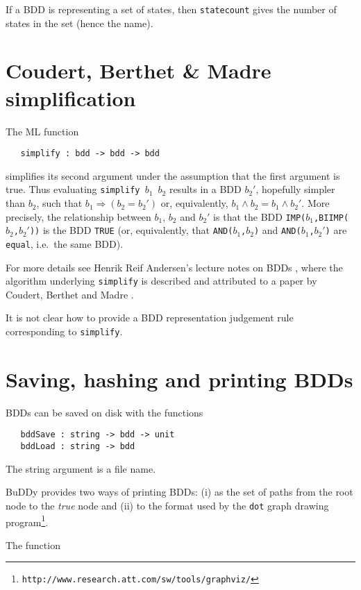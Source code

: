 \documentclass[12pt]{article}
\newcommand{\bnind}[1]{\index[MLbn]{#1}}
\renewcommand{\t}[1]{\mbox{\tt #1}}
\newcommand{\ml}[1]{{\tt #1}}
\newcommand{\Buddy}{BuDDy\xspace}
\newcommand{\Imp}{\Rightarrow}
\begin{document}
If a BDD is representing a set of states, then \t{statecount} gives
the number of states in the set (hence the name).


\section{Coudert, Berthet \& Madre simplification}

The ML function

\begin{verbatim}
   simplify : bdd -> bdd -> bdd
\end{verbatim}\bnind{\ml{simplify}}

simplifies its second argument under the assumption that the first
argument is true. Thus evaluating
\t{simplify~$b_1$~$b_2$} results in a BDD $b_2'$, hopefully simpler than $b_2$, such that
$b_1 \Imp (b_2 = b_2')$ or, equivalently, \mbox{$b_1 \wedge b_2 = b_1 \wedge b_2'$}.
More precisely,
the relationship between $b_1$, $b_2$ and $b_2'$ is that
the BDD \t{IMP($b_1$,BIIMP($b_2$,$b_2'$))} is the BDD \t{TRUE}
(or, equivalently, that \t{AND($b_1$,$b_2$)} and \t{AND($b_1$,$b_2'$)}
are \t{equal}, i.e.~the same BDD).

For more details see Henrik Reif Andersen's lecture
notes on BDDs \cite{HenrikNotes}, where
the algorithm underlying \t{simplify} is described and attributed to a paper by
Coudert, Berthet and Madre \cite{CoudertBerthetMadre}.

It is not clear how to provide a BDD representation judgement rule
corresponding to \t{simplify}.

\section{Saving, hashing and printing BDDs}

BDDs can be saved on disk with the functions

\begin{verbatim}
   bddSave : string -> bdd -> unit
   bddLoad : string -> bdd
\end{verbatim}\bnind{\ml{bddSave}}\bnind{\ml{bddLoad}}

The string argument is a file name.

\Buddy{} provides two ways of printing BDDs: (i) as the set of paths from
the root node to the {\it{true}} node and (ii) to the format used by
the \t{dot} graph drawing
program\footnote{\tt{http://www.research.att.com/sw/tools/graphviz/}}.

The function
\end{document}
